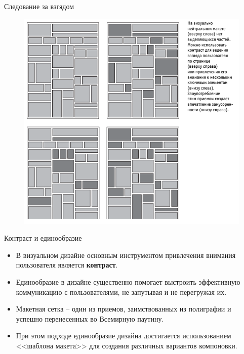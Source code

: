 \documentclass{beamer}
\begin{document}
\begin{frame}[t]{Следование за взгядом}
	\begin{figure}[h]
		\centering
		\includegraphics[scale=0.5]{images/lec05-pic02.png}
	\end{figure}
\end{frame}  

\begin{frame}[t]{Контраст и единообразие}
	\begin{itemize}
		\item В визуальном дизайне основным инструментом привлечения внимания пользователя является \textbf{контраст}.

		\item Единообразие в дизайне существенно помогает выстроить эффективную коммуникацию с пользователями, не запутывая и не перегружая их.

		\item Макетная сетка – один из приемов, заимствованных из полиграфии и успешно перенесенных во Всемирную паутину. 

		\item При этом подходе единообразие дизайна достигается использованием <<шаблона макета>> для создания различных вариантов компоновки.
	\end{itemize}
\end{frame}
\end{document}
